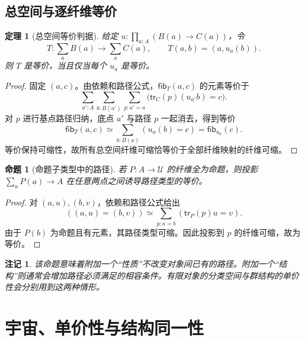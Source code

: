 \documentclass[12pt,oneside,openany,fontset=none]{ctexbook}
\theoremstyle{cn}
\newtheorem{proposition}[definition]{命题}
\newtheorem{theorem}[definition]{定理}
\newtheorem{remark}[definition]{注记}
\numberwithin{equation}{chapter}
\newcommand{\U}{\mathcal U}
\newcommand{\tr}{\mathsf{tr}}
\newcommand{\fib}{\mathsf{fib}}
\begin{document}
\section{总空间与逐纤维等价}
\begin{theorem}[总空间等价判据]\label{thm:fiberwise}
给定 $u:\prod_{a:A}(B(a)\to C(a))$，令
\[
T:\sum_aB(a)\to\sum_aC(a),\qquad T(a,b)=(a,u_a(b)).
\]
则 $T$ 是等价，当且仅当每个 $u_a$ 是等价。
\end{theorem}
\begin{proof}
固定 $(a,c)$。由依赖和路径公式，$\fib_T(a,c)$ 的元素等价于
\[
\sum_{a':A}\sum_{b:B(a')}\sum_{p:a'=a}
\bigl(\tr_C(p)(u_{a'}b)=c\bigr).
\]
对 $p$ 进行基点路径归纳，底点 $a'$ 与路径 $p$ 一起消去，得到等价
\[
\fib_T(a,c)\simeq\sum_{b:B(a)}(u_a(b)=c)=\fib_{u_a}(c).
\]
等价保持可缩性，故所有总空间纤维可缩恰等价于全部纤维映射的纤维可缩。
\end{proof}
\begin{proposition}[命题子类型中的路径]
若 $P:A\to\U$ 的纤维全为命题，则投影 $\sum_aP(a)\to A$ 在任意两点之间诱导路径类型的等价。
\end{proposition}
\begin{proof}
对 $(a,u),(b,v)$，依赖和路径公式给出
\[
((a,u)=(b,v))\simeq\sum_{p:a=b}(\tr_P(p)u=v).
\]
由于 $P(b)$ 为命题且有元素，其路径类型可缩。因此投影到 $p$ 的纤维可缩，故为等价。
\end{proof}
\begin{remark}
该命题意味着附加一个“性质”不改变对象间已有的路径。附加一个“结构”则通常会增加路径必须满足的相容条件。有限对象的分类空间与群结构的单价性会分别用到这两种情形。
\end{remark}



\chapter{宇宙、单价性与结构同一性}
\end{document}
